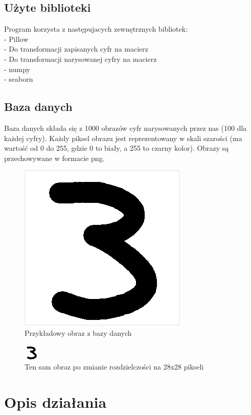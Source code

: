 \documentclass[12pt,a4paper]{article}
\begin{document}
\subsection{Użyte biblioteki}
Program korzysta z następujacych zewnętrznych bibliotek:\\
- Pillow\\
\indent - Do transformacji zapisanych cyfr na macierz\\
\indent - Do transformacji narysowanej cyfry na macierz\\
- numpy\\
- seaborn
\subsection{Baza danych}
Baza danych składa się z 1000 obrazów cyfr narysowanych przez nas (100 dla każdej cyfry). Każdy piksel obrazu jest reprezentowany w skali
szarości (ma wartość od 0 do 255, gdzie 0 to biały, a 255 to czarny kolor). Obrazy są przechowywane w formacie png.
\newpage
\begin{figure}[!h]
	\includegraphics[scale=0.8]{"number_example.png"}
	\centering
	\caption{Przykładowy obraz z bazy danych}
\end{figure}
\begin{figure}[!h]
	\includegraphics[scale=8]{"normalized.png"}
	\centering
	\caption{Ten sam obraz po zmianie rozdzielczości na 28x28 pikseli}
\end{figure}
\newpage
\section{Opis działania}
\end{document}

